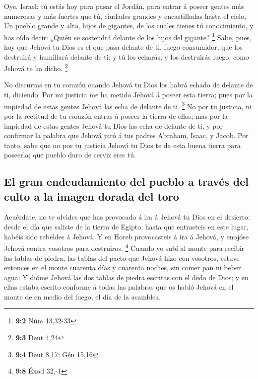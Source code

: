  Oye, Israel: tú estás hoy para pasar el Jordán, para entrar
á poseer gentes más numerosas y más fuertes que tú, ciudades grandes y
encastilladas hasta el cielo,  Un pueblo grande y alto,
hijos de gigantes, de los cuales tienes tú conocimiento, y has oído
decir: ¿Quién se sostendrá delante de los hijos del gigante? \footnote{\textbf{9:2}
  Núm 13,32-33}  Sabe, pues, hoy que Jehová tu Dios es el
que pasa delante de ti, fuego consumidor, que los destruirá y humillará
delante de ti: y tú los echarás, y los destruirás luego, como Jehová te
ha dicho. \footnote{\textbf{9:3} Deut 4,24}

 No discurras en tu corazón cuando Jehová tu Dios los habrá
echado de delante de ti, diciendo: Por mi justicia me ha metido Jehová á
poseer esta tierra; pues por la impiedad de estas gentes Jehová las echa
de delante de ti. \footnote{\textbf{9:4} Deut 8,17; Gén 15,16}
 No por tu justicia, ni por la rectitud de tu corazón entras
á poseer la tierra de ellos; mas por la impiedad de estas gentes Jehová
tu Dios las echa de delante de ti, y por confirmar la palabra que Jehová
juró á tus padres Abraham, Isaac, y Jacob.  Por tanto, sabe
que no por tu justicia Jehová tu Dios te da esta buena tierra para
poseerla; que pueblo duro de cerviz eres tú.

\hypertarget{el-gran-endeudamiento-del-pueblo-a-travuxe9s-del-culto-a-la-imagen-dorada-del-toro}{%
\subsection{El gran endeudamiento del pueblo a través del culto a la
imagen dorada del
toro}\label{el-gran-endeudamiento-del-pueblo-a-travuxe9s-del-culto-a-la-imagen-dorada-del-toro}}

 Acuérdate, no te olvides que has provocado á ira á Jehová
tu Dios en el desierto: desde el día que saliste de la tierra de Egipto,
hasta que entrasteis en este lugar, habéis sido rebeldes á Jehová.
 Y en Horeb provocasteis á ira á Jehová, y enojóse Jehová
contra vosotros para destruiros. \footnote{\textbf{9:8} Éxod 32,-1}
 Cuando yo subí al monte para recibir las tablas de piedra,
las tablas del pacto que Jehová hizo con vosotros, estuve entonces en el
monte cuarenta días y cuarenta noches, sin comer pan ni beber agua:
 Y dióme Jehová las dos tablas de piedra escritas con el
dedo de Dios; y en ellas estaba escrito conforme á todas las palabras
que os habló Jehová en el monte de en medio del fuego, el día de la
asamblea.

